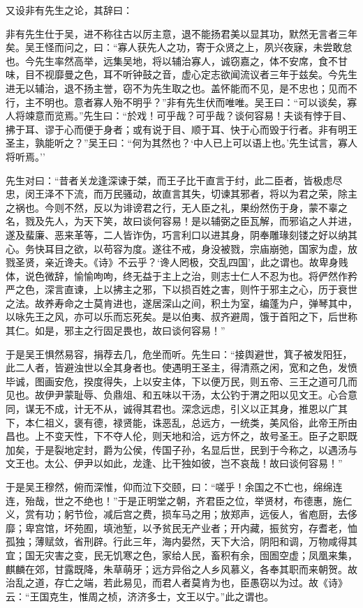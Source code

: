 \documentclass[]{article}
\begin{document}
又设非有先生之论，其辞曰：

非有先生仕于吴，进不称往古以厉主意，退不能扬君美以显其功，默然无言者三年矣。吴王怪而问之，曰：``寡人获先人之功，寄于众贤之上，夙兴夜寐，未尝敢怠也。今先生率然高举，远集吴地，将以辅治寡人，诚窃嘉之，体不安席，食不甘味，目不视靡曼之色，耳不听钟鼓之音，虚心定志欲闻流议者三年于兹矣。今先生进无以辅治，退不扬主誉，窃不为先生取之也。盖怀能而不见，是不忠也；见而不行，主不明也。意者寡人殆不明乎？''非有先生伏而唯唯。吴王曰：``可以谈矣，寡人将竦意而览焉。''先生曰：``於戏！可乎哉？可乎哉？谈何容易！夫谈有悖于目、拂于耳、谬于心而便于身者；或有说于目、顺于耳、快于心而毁于行者。非有明王圣主，孰能听之？''吴王曰：``何为其然也？`中人已上可以语上也。'先生试言，寡人将听焉。''

先生对曰：``昔者关龙逢深谏于桀，而王子比干直言于纣，此二臣者，皆极虑尽忠，闵王泽不下流，而万民骚动，故直言其失，切谏其邪者，将以为君之荣，除主之祸也。今则不然，反以为诽谤君之行，无人臣之礼，果纷然伤于身，蒙不辜之名，戮及先人，为天下笑，故曰谈何容易！是以辅弼之臣瓦解，而邪谄之人并进，遂及蜚廉、恶来革等，二人皆诈伪，巧言利口以进其身，阴奉雕瑑刻镂之好以纳其心。务快耳目之欲，以苟容为度。遂往不戒，身没被戮，宗庙崩弛，国家为虚，放戮圣贤，亲近谗夫。《诗》不云乎？`谗人罔极，交乱四国'，此之谓也。故卑身贱体，说色微辞，愉愉呴呴，终无益于主上之治，则志士仁人不忍为也。将俨然作矜严之色，深言直谏，上以拂主之邪，下以损百姓之害，则忤于邪主之心，历于衰世之法。故养寿命之士莫肯进也，遂居深山之间，积土为室，编蓬为户，弹琴其中，以咏先王之风，亦可以乐而忘死矣。是以伯夷、叔齐避周，饿于首阳之下，后世称其仁。如是，邪主之行固足畏也，故曰谈何容易！''

于是吴王惧然易容，捐荐去几，危坐而听。先生曰：``接舆避世，箕子被发阳狂，此二人者，皆避浊世以全其身者也。使遇明王圣主，得清燕之闲，宽和之色，发愤毕诚，图画安危，揆度得失，上以安主体，下以便万民，则五帝、三王之道可几而见也。故伊尹蒙耻辱、负鼎俎、和五味以干汤，太公钓于渭之阳以见文王。心合意同，谋无不成，计无不从，诚得其君也。深念远虑，引义以正其身，推恩以广其下，本仁祖义，褒有德，禄贤能，诛恶乱，总远方，一统类，美风俗，此帝王所由昌也。上不变天性，下不夺人伦，则天地和洽，远方怀之，故号圣王。臣子之职既加矣，于是裂地定封，爵为公侯，传国子孙，名显后世，民到于今称之，以遇汤与文王也。太公、伊尹以如此，龙逢、比干独如彼，岂不哀哉！故曰谈何容易！''

于是吴王穆然，俯而深惟，仰而泣下交颐，曰：``嗟乎！余国之不亡也，绵绵连连，殆哉，世之不绝也！''于是正明堂之朝，齐君臣之位，举贤材，布德惠，施仁义，赏有功；躬节俭，减后宫之费，损车马之用；放郑声，远佞人，省庖厨，去侈靡；卑宫馆，坏苑囿，填池堑，以予贫民无产业者；开内藏，振贫穷，存耆老，恤孤独；薄赋敛，省刑辟。行此三年，海内晏然，天下大洽，阴阳和调，万物咸得其宜；国无灾害之变，民无饥寒之色，家给人民，畜积有余，囹圄空虚；凤凰来集，麒麟在郊，甘露既降，朱草萌牙；远方异俗之人乡风慕义，各奉其职而来朝贺。故治乱之道，存亡之端，若此易见，而君人者莫肯为也，臣愚窃以为过。故《诗》云：``王国克生，惟周之桢，济济多士，文王以宁。''此之谓也。
\end{document}
